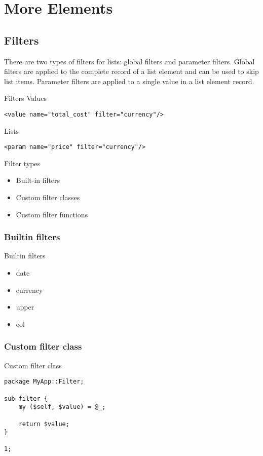 \section{More Elements}
\subsection{Filters}
There are two types of filters for lists: global filters and
parameter filters. Global filters are applied to the complete
record of a list element and can be used to skip list items.
Parameter filters are applied to a single value in a list
element record.

\begin{frame}[fragile]{Filters}
Values
\begin{lstlisting}
<value name="total_cost" filter="currency"/>
\end{lstlisting}
Lists
\begin{lstlisting}
<param name="price" filter="currency"/>
\end{lstlisting}

\end{frame}

\begin{frame}{Filter types}
\begin{itemize}
\item{Built-in filters}
\item{Custom filter classes}
\item{Custom filter functions}
\end{itemize}
\end{frame}

\subsubsection{Builtin filters}
\begin{frame}{Builtin filters}
\begin{itemize}
\item date
\item currency
\item upper
\item eol
\end{itemize}
\end{frame}

\subsubsection{Custom filter class}
\begin{frame}[fragile]{Custom filter class}
\begin{lstlisting}
package MyApp::Filter;

sub filter {
    my ($self, $value) = @_;

    return $value;
}

1;
\end{lstlisting}
\end{frame}

